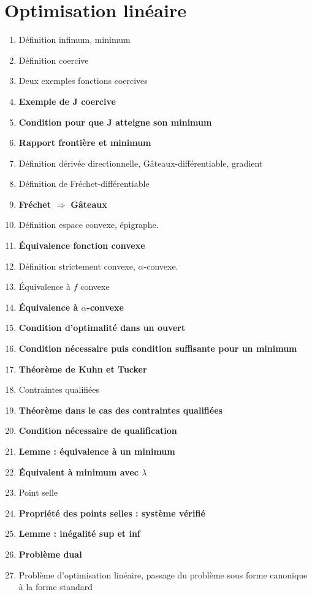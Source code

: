 \documentclass{article}
\begin{document}
\part{Optimisation linéaire}
\begin{enumerate}
\item Définition infimum, minimum
\item Définition coercive
\item Deux exemples fonctions coercives
\item \textbf{Exemple de J coercive}
\item \textbf{Condition pour que J atteigne son minimum}
\item \textbf{Rapport frontière et minimum}
\item Définition dérivée directionnelle, Gâteaux-différentiable, gradient
\item Définition de Fréchet-différentiable
\item \textbf{Fréchet $\Rightarrow$ Gâteaux}
\item Définition espace convexe, épigraphe.
\item \textbf{Équivalence fonction convexe}
\item Définition strictement convexe, $\alpha$-convexe.
\item Équivalence à $f$ convexe
\item \textbf{Équivalence à $\alpha$-convexe}
\item \textbf{Condition d'optimalité dans un ouvert}
\item \textbf{Condition nécessaire puis condition suffisante pour un minimum}
\item \textbf{Théorème de Kuhn et Tucker}
\item Contraintes qualifiées
\item \textbf{Théorème dans le cas des contraintes qualifiées}
\item \textbf{Condition nécessaire de qualification}
\item \textbf{Lemme : équivalence à un minimum}
\item \textbf{Équivalent à minimum avec $\lambda$}
\item Point selle
\item \textbf{Propriété des points selles : système vérifié}
\item \textbf{Lemme : inégalité sup et inf}
\item \textbf{Problème dual}
\item Problème d'optimisation linéaire, passage du problème sous forme canonique à la forme standard

\end{enumerate}
\end{document}

